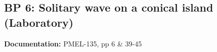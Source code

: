 \newsection

\subsection{BP 6:
 Solitary wave on a conical island (Laboratory)}

{\bf Documentation:}  PMEL-135, pp 6 \& 39-45


